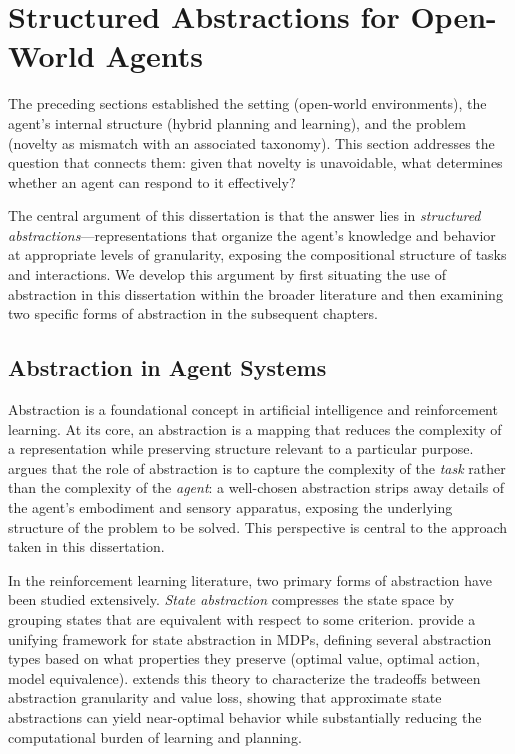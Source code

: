 \section{Structured Abstractions for Open-World Agents}
\label{sec:abstractions}

The preceding sections established the setting (open-world environments), the agent's internal structure (hybrid planning and learning), and the problem (novelty as mismatch with an associated taxonomy). This section addresses the question that connects them: given that novelty is unavoidable, what determines whether an agent can respond to it effectively?

The central argument of this dissertation is that the answer lies in \emph{structured abstractions}---representations that organize the agent's knowledge and behavior at appropriate levels of granularity, exposing the compositional structure of tasks and interactions. We develop this argument by first situating the use of abstraction in this dissertation within the broader literature and then examining two specific forms of abstraction in the subsequent chapters.

\subsection{Abstraction in Agent Systems}
\label{sec:abstraction_definition}

Abstraction is a foundational concept in artificial intelligence and reinforcement learning. At its core, an abstraction is a mapping that reduces the complexity of a representation while preserving structure relevant to a particular purpose. \citet{konidaris2019necessity} argues that the role of abstraction is to capture the complexity of the \emph{task} rather than the complexity of the \emph{agent}: a well-chosen abstraction strips away details of the agent's embodiment and sensory apparatus, exposing the underlying structure of the problem to be solved. This perspective is central to the approach taken in this dissertation.

In the reinforcement learning literature, two primary forms of abstraction have been studied extensively. \emph{State abstraction} compresses the state space by grouping states that are equivalent with respect to some criterion. \citet{li2006towards} provide a unifying framework for state abstraction in MDPs, defining several abstraction types based on what properties they preserve (optimal value, optimal action, model equivalence). \citet{abel2020theory} extends this theory to characterize the tradeoffs between abstraction granularity and value loss, showing that approximate state abstractions can yield near-optimal behavior while substantially reducing the computational burden of learning and planning.

